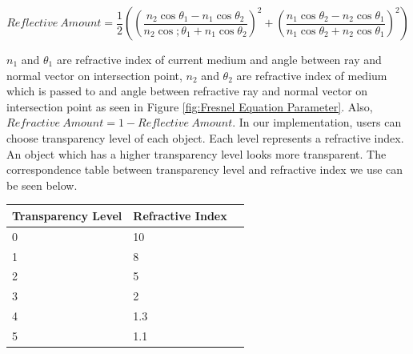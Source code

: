 \documentclass[a4paper, 12pt]{article}
\begin{document}
\[Reflective\ Amount = \frac{1}{2}((\frac{n_2\cos{\theta_1} - n_1\cos{\theta_2}}{n_2\cos;{\theta_1} + n_1\cos{\theta_2}})^2 + (\frac{n_1\cos{\theta_2} - n_2\cos{\theta_1}}{n_1\cos{\theta_2} + n_2\cos{\theta_1}})^2)\]

$n_1$ and $\theta_1$ are refractive index of current medium and angle between ray and normal vector on intersection point, $n_2$ and $\theta_2$ are refractive index of medium which is passed to and angle between refractive ray and normal vector on intersection point as seen in Figure \ref{fig:Fresnel Equation Parameter}. Also, $Refractive\ Amount = 1 - Reflective\ Amount$. In our implementation, users can choose transparency level of each object. Each level represents a refractive index. An object which has a higher transparency level looks more transparent. The correspondence table between transparency level and refractive index we use can be seen below.

\begin{center}
    \begin{tabular}{| l | l | l}
    \hline
    Transparency Level & Refractive Index \\ \hline
    0 & 10 \\ \hline
    1 & 8 \\ \hline
    2 & 5 \\ \hline
    3 & 2 \\ \hline
    4 & 1.3 \\ \hline
    5 & 1.1 \\ \hline
    \end{tabular}
\end{center}
\end{document}
